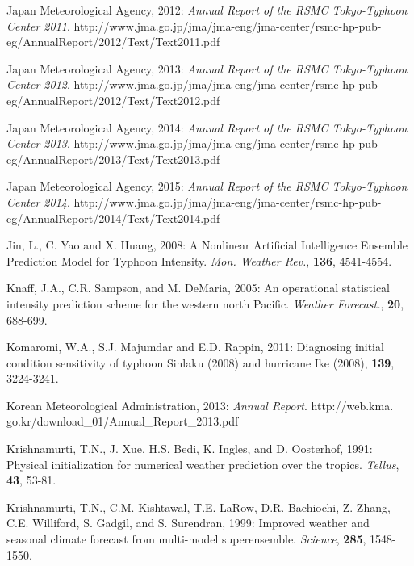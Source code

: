 \documentclass[a4paper, 12pt]{article}
\begin{document}
{\begin{list}{}{\leftmargin=1em \itemindent=-2em}
\item Japan Meteorological Agency, 2012: {\em Annual Report of the RSMC Tokyo-Typhoon Center 2011}. http://www.jma.go.jp/jma/jma-eng/jma-center/rsmc-hp-pub-eg/AnnualReport/2012/Text/Text2011.pdf

\item Japan Meteorological Agency, 2013: {\em Annual Report of the RSMC Tokyo-Typhoon Center 2012}. http://www.jma.go.jp/jma/jma-eng/jma-center/rsmc-hp-pub-eg/AnnualReport/2012/Text/Text2012.pdf

\item Japan Meteorological Agency, 2014: {\em Annual Report of the RSMC Tokyo-Typhoon Center 2013}. http://www.jma.go.jp/jma/jma-eng/jma-center/rsmc-hp-pub-eg/AnnualReport/2013/Text/Text2013.pdf

\item Japan Meteorological Agency, 2015: {\em Annual Report of the RSMC Tokyo-Typhoon Center 2014}. http://www.jma.go.jp/jma/jma-eng/jma-center/rsmc-hp-pub-eg/AnnualReport/2014/Text/Text2014.pdf


\item Jin, L., C. Yao and X. Huang, 2008: A Nonlinear Artificial Intelligence Ensemble Prediction Model for Typhoon Intensity. \emph{Mon. Weather Rev.}, {\bf 136}, 4541-4554.

\item Knaff, J.A., C.R. Sampson, and M. DeMaria, 2005: An operational statistical intensity prediction scheme for the western north Pacific. \emph{Weather Forecast.}, {\bf 20}, 688-699.


    \item Komaromi, W.A., S.J. Majumdar and E.D. Rappin, 2011: Diagnosing initial condition sensitivity of typhoon Sinlaku (2008) and hurricane Ike (2008), {\bf 139}, 3224-3241.

\item  Korean Meteorological Administration, 2013: {\em Annual Report}.  http://web.kma. go.kr/download\_01/Annual\_Report\_2013.pdf

\item Krishnamurti, T.N., J. Xue, H.S. Bedi, K. Ingles, and D. Oosterhof, 1991: Physical initialization for numerical weather prediction over the tropics. \emph{Tellus}, {\bf 43}, 53-81.

\item Krishnamurti, T.N., C.M. Kishtawal, T.E. LaRow, D.R. Bachiochi, Z. Zhang, C.E. Williford, S. Gadgil, and S. Surendran, 1999: Improved weather and seasonal climate forecast from multi-model superensemble. \emph{Science}, {\bf 285}, 1548-1550.


\end{list}}
\end{document}

